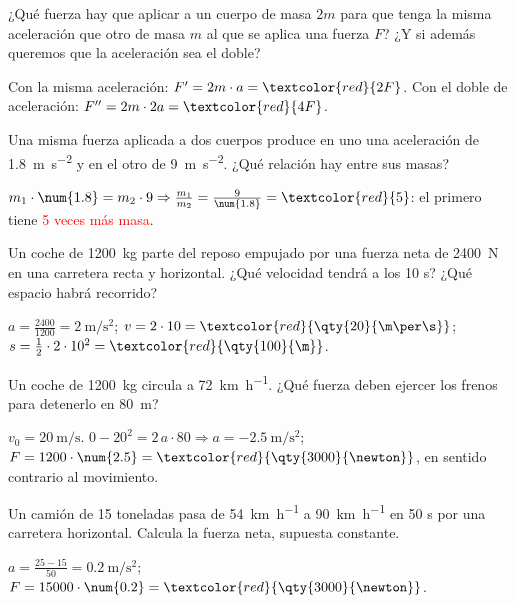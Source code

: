 \begin{exercise}
    ¿Qué fuerza hay que aplicar a un cuerpo de masa \(2m\) para que tenga la misma aceleración que otro de masa \(m\) al que se aplica una fuerza \(F\)? ¿Y si además queremos que la aceleración sea el doble?
    \begin{solu}
        Con la misma aceleración: \(F' = 2m \cdot a = \textcolor{red}{2F}\). Con el doble de aceleración: \(F'' = 2m \cdot 2a = \textcolor{red}{4F}\).
    \end{solu}
\end{exercise}

\begin{exercise}
    Una misma fuerza aplicada a dos cuerpos produce en uno una aceleración de \qty{1.8}{\m\per\square\s} y en el otro de \qty{9}{\m\per\square\s}. ¿Qué relación hay entre sus masas?
    \begin{solu}
        \(m_1 \cdot \num{1.8} = m_2 \cdot 9 \Rightarrow \frac{m_1}{m_2} = \frac{9}{\num{1.8}} = \textcolor{red}{5}\): el primero tiene \textcolor{red}{5 veces más masa}.
    \end{solu}
\end{exercise}

\begin{exercise}
    Un coche de \qty{1200}{\kg} parte del reposo empujado por una fuerza neta de \qty{2400}{\newton} en una carretera recta y horizontal. ¿Qué velocidad tendrá a los 10 s? ¿Qué espacio habrá recorrido?
    \begin{solu}
        \(a = \frac{2400}{1200} = \qty{2}{\m\per\square\s}\); \(v = 2 \cdot 10 = \textcolor{red}{\qty{20}{\m\per\s}}\); \(s = \frac{1}{2} \cdot 2 \cdot 10^2 = \textcolor{red}{\qty{100}{\m}}\).
    \end{solu}
\end{exercise}

\begin{exercise}
    Un coche de \qty{1200}{\kg} circula a \qty{72}{\km\per\hour}. ¿Qué fuerza deben ejercer los frenos para detenerlo en \qty{80}{\m}?
    \begin{solu}
        \(v_0 = \qty{20}{\m\per\s}\). \(0 - 20^2 = 2\,a \cdot 80 \Rightarrow a = \qty{-2.5}{\m\per\square\s}\); \(F = 1200 \cdot \num{2.5} = \textcolor{red}{\qty{3000}{\newton}}\), en sentido contrario al movimiento.
    \end{solu}
\end{exercise}

\begin{exercise}
    Un camión de 15 toneladas pasa de \qty{54}{\km\per\hour} a \qty{90}{\km\per\hour} en 50 s por una carretera horizontal. Calcula la fuerza neta, supuesta constante.
    \begin{solu}
        \(a = \frac{25 - 15}{50} = \qty{0.2}{\m\per\square\s}\); \(F = 15000 \cdot \num{0.2} = \textcolor{red}{\qty{3000}{\newton}}\).
    \end{solu}
\end{exercise}

